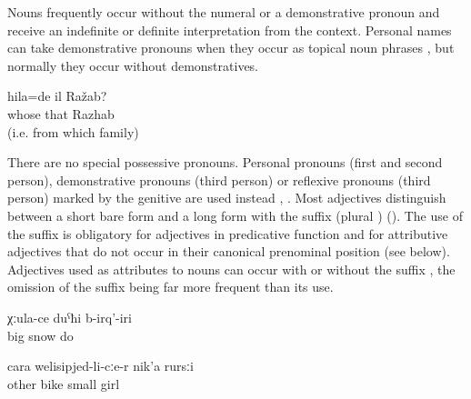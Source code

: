 Nouns frequently occur without the numeral  or a demonstrative pronoun and receive an indefinite or definite interpretation from the context. Personal names can take demonstrative pronouns when they occur as topical noun phrases , but normally they occur without demonstratives.
%
\begin{exe}
	\ex	\label{ex:Whose was that Razhab@3}
	\gll	hila=de	il	Ražab?\\
		whose	that	Razhab\\
	\glt	{} (i.e. from which family)
\end{exe}

There are no special possessive pronouns. Personal pronouns (first and second person), demonstrative pronouns (third person) or reflexive pronouns (third person) marked by the genitive are used instead , . Most adjectives distinguish between a short bare form and a long form with the suffix  (plural ) (). The use of the suffix is obligatory for adjectives in predicative function and for attributive adjectives that do not occur in their canonical prenominal position (see  below). Adjectives used as attributes to nouns can occur with  or without the suffix , the omission of the suffix being far more frequent than its use.
%
\begin{exe}

		\ex	\label{ex:It snowed a lot@4a}
		\gll	χːula-ce	duˁħi	b-irq'-iri\\
			big	snow	do\\
		\glt	{}
	
		\ex	\label{ex:another little girl on a bike@4b}
		\gll	cara	welisipjed-li-cːe-r	nik'a	rursːi\\
			other	bike	small	girl\\
		\glt	{}

\end{exe}

